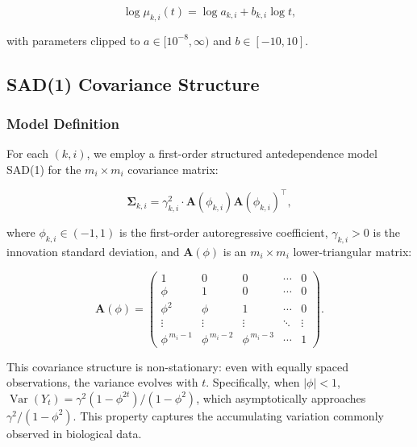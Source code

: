 \documentclass[12pt,a4paper]{article}
\DeclareMathOperator{\var}{Var}
\begin{document}
\begin{equation}\label{eq:loglinear_init}
    \log \mu_{k,i}(t) = \log a_{k,i} + b_{k,i} \log t,
\end{equation}

with parameters clipped to $a \in [10^{-8}, \infty)$ and $b \in [-10, 10]$.

\subsection{SAD(1) Covariance Structure}

\subsubsection{Model Definition}

For each $(k,i)$, we employ a first-order structured antedependence model SAD(1) \cite{nunez1997longitudinal,zhao2005non,zhao2005structured} for the $m_i \times m_i$ covariance matrix:

\begin{equation}\label{eq:sad_decomp}
    \bm{\Sigma}_{k,i} = \gamma_{k,i}^2 \cdot \bm{A}(\phi_{k,i}) \bm{A}(\phi_{k,i})^\top,
\end{equation}

where $\phi_{k,i} \in (-1, 1)$ is the first-order autoregressive coefficient, $\gamma_{k,i} > 0$ is the innovation standard deviation, and $\bm{A}(\phi)$ is an $m_i \times m_i$ lower-triangular matrix:

\begin{equation}\label{eq:A_matrix}
    \bm{A}(\phi) = \begin{pmatrix}
        1 & 0 & 0 & \cdots & 0 \\
        \phi & 1 & 0 & \cdots & 0 \\
        \phi^2 & \phi & 1 & \cdots & 0 \\
        \vdots & \vdots & \vdots & \ddots & \vdots \\
        \phi^{\,m_i-1} & \phi^{\,m_i-2} & \phi^{\,m_i-3} & \cdots & 1
    \end{pmatrix}.
\end{equation}

This covariance structure is non-stationary: even with equally spaced observations, the variance evolves with $t$. Specifically, when $|\phi| < 1$, $\var(Y_t) = \gamma^2 (1-\phi^{2t})/(1-\phi^2)$, which asymptotically approaches $\gamma^2/(1-\phi^2)$. This property captures the accumulating variation commonly observed in biological data.
\end{document}
